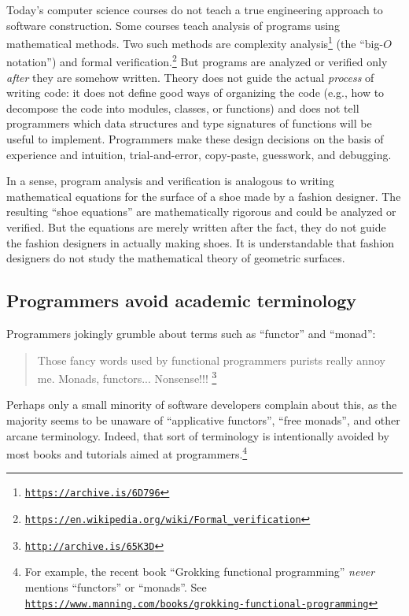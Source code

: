 Today\textsf{'}s computer science courses do not teach a true engineering approach
to software construction. Some courses teach analysis of programs
using mathematical methods. Two such methods are complexity analysis\footnote{\texttt{\href{https://www.cs.cmu.edu/~adamchik/15-121/lectures/Algorithmic\%20Complexity/complexity.html}{https://archive.is/6D796}}}
(the \textsf{``}big-$O$ notation\textsf{''}) and formal verification.\footnote{\texttt{\href{https://en.wikipedia.org/wiki/Formal_verification}{https://en.wikipedia.org/wiki/Formal\_verification}}}
But programs are analyzed or verified only \emph{after} they are somehow
written. Theory does not guide the actual \emph{process} of writing
code: it does not define good ways of organizing the code (e.g., how
to decompose the code into modules, classes, or functions) and does
not tell programmers which data structures and type signatures of
functions will be useful to implement. Programmers make these design
decisions on the basis of experience and intuition, trial-and-error,
copy-paste, guesswork, and debugging. 

In a sense, program analysis and verification is analogous to writing
mathematical equations for the surface of a shoe made by a fashion
designer. The resulting \textsf{``}shoe equations\textsf{''} are mathematically rigorous
and could be analyzed or verified. But the equations are merely written
after the fact, they do not guide the fashion designers in actually
making shoes. It is understandable that fashion designers do not study
the mathematical theory of geometric surfaces.

\subsection*{Programmers avoid academic terminology }

Programmers jokingly grumble about terms such as \textsf{``}functor\textsf{''} and
\textsf{``}monad\textsf{''}:
\begin{quote}
{\small{}Those fancy words used by functional programmers purists
really annoy me. Monads, functors... Nonsense!!! }\footnote{\texttt{\href{http://archive.is/65K3D}{http://archive.is/65K3D}}}
\end{quote}
Perhaps only a small minority of software developers complain about
this, as the majority seems to be unaware of \textsf{``}applicative functors\textsf{''},
\textsf{``}free monads\textsf{''}, and other arcane terminology. Indeed, that sort
of terminology is intentionally avoided by most books and tutorials
aimed at programmers.\footnote{For example, the recent book \textsf{``}Grokking functional programming\textsf{''}
\emph{never} mentions \textsf{``}functors\textsf{''} or \textsf{``}monads\textsf{''}. See \texttt{\href{https://www.manning.com/books/grokking-functional-programming}{https://www.manning.com/books/grokking-functional-programming}}}

